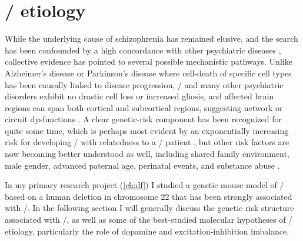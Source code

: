 \section{\Scz/ etiology}
\label{sec:intro:scz:etiology}
While the underlying cause of schizophrenia has remained elusive, and the search has been confounded by a high concordance with other psychiatric diseases \citep{Kessler2005}, collective evidence has pointed to several possible mechanistic pathways.
Unlike Alzheimer's disease or Parkinson's disease where cell-death of specific cell types has been causally linked to disease progression, \scz/ and many other psychiatric disorders exhibit no drastic cell loss or increased gliosis, and affected brain regions can span both cortical and subcortical regions, suggesting network or circuit dysfunctions \citep{Uhlhaas2012, Lewis2002}.
A clear genetic-risk component has been recognized for quite some time, which is perhaps most evident by an exponentially increasing risk for developing \scz/ with relatedness to a \scz/ patient \citep{Rodriguez-Murillo2012}, but other risk factors are now becoming better understood as well, including shared family environment, male gender, advanced paternal age, perinatal events, and substance abuse \citep{Lichtenstein2009}.

In my primary research project (\autoref{ch:df}) I studied a genetic mouse model of \scz/ based on a human deletion in chromosome 22 that has been strongly associated with \scz/. In the following section I will generally discuss the genetic risk structure associated with \scz/, as well as some of the best-studied molecular hypotheses of \scz/ etiology, particularly the role of dopamine and excitation-inhibition imbalance.

